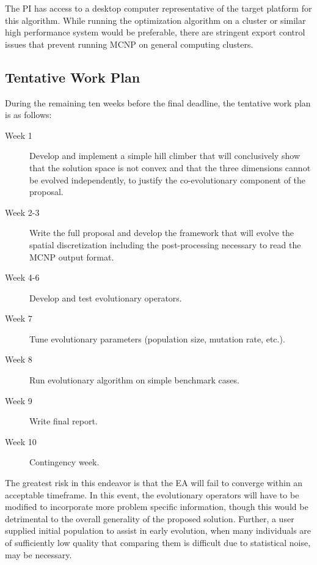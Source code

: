 \documentclass{article}
\begin{document}
The PI has access to a desktop computer representative of the target platform for this algorithm. While running the optimization algorithm on a cluster or similar high performance system would be preferable, there are stringent export control issues that prevent running MCNP on general computing clusters. 

\subsection{Tentative Work Plan}\label{sec:b5}
During the remaining ten weeks before the final deadline, the tentative work plan is as follows:

\begin{description}
\item[Week 1] Develop and implement a simple hill climber that will conclusively show that the solution space is not convex and that the three dimensions cannot be evolved independently, to justify the co-evolutionary component of the proposal.

\item[Week 2-3] Write the full proposal and develop the framework that will evolve the spatial discretization including the post-processing necessary to read the MCNP output format.

\item [Week 4-6] Develop and test evolutionary operators.

\item [Week 7] Tune evolutionary parameters (population size, mutation rate, etc.).

\item [Week 8] Run evolutionary algorithm on simple benchmark cases.

\item [Week 9] Write final report.

\item [Week 10] Contingency week.
\end{description}

The greatest risk in this endeavor is that the EA will fail to converge within an acceptable timeframe. In this event, the evolutionary operators will have to be modified to incorporate more problem specific information, though this would be detrimental to the overall generality of the proposed solution. Further, a user supplied initial population to assist in early evolution, when many individuals are of sufficiently low quality that comparing them is difficult due to statistical noise, may be necessary.
\end{document}
